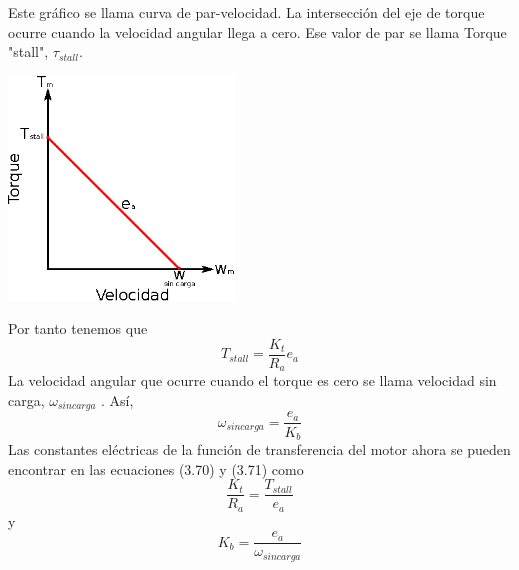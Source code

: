 Este gráfico se llama curva de par-velocidad. La intersección del eje de torque ocurre cuando la velocidad angular llega a cero.
Ese valor de par se llama Torque "stall", $\tau_{stall}$.
\begin{center}
	\includegraphics[width=0.45\textwidth]{Contenido/Cuerpo/Capitulo3/Fig19.eps}
	\label{fig:ModeloMat:Fig1}
\end{center}
Por tanto tenemos que
\begin{equation}
	T_{stall} = \frac{K_t}{R_a}e_a
\end{equation}
La velocidad angular que ocurre cuando el torque es cero se llama velocidad sin carga, $\omega_{sin carga}$ . Así,
\begin{equation}
	\omega_{sin carga} = \frac{e_a}{K_b}
\end{equation}
Las constantes eléctricas de la función de transferencia del motor ahora se pueden encontrar en las ecuaciones (3.70) y (3.71) como
\begin{equation}
	\frac{K_t}{R_a} = \frac{T_{stall}}{e_a}
\end{equation}
y
\begin{equation}
	K_b = \frac{e_a}{\omega_{sincarga}}
\end{equation}